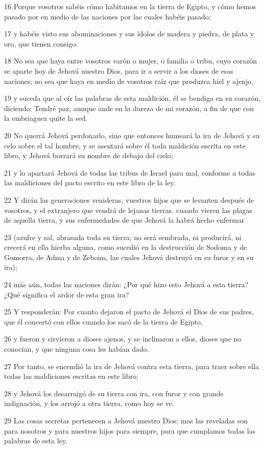 \par 16 Porque vosotros sabéis cómo habitamos en la tierra de Egipto, y cómo hemos pasado por en medio de las naciones por las cuales habéis pasado; 
\par 17 y habéis visto sus abominaciones y sus ídolos de madera y piedra, de plata y oro, que tienen consigo.
\par 18 No sea que haya entre vosotros varón o mujer, o familia o tribu, cuyo corazón se aparte hoy de Jehová nuestro Dios, para ir a servir a los dioses de esas naciones; no sea que haya en medio de vosotros raíz que produzca hiel y ajenjo, 
\par 19 y suceda que al oír las palabras de esta maldición, él se bendiga en su corazón, diciendo: Tendré paz, aunque ande en la dureza de mi corazón, a fin de que con la embriaguez quite la sed.
\par 20 No querrá Jehová perdonarlo, sino que entonces humeará la ira de Jehová y su celo sobre el tal hombre, y se asentará sobre él toda maldición escrita en este libro, y Jehová borrará su nombre de debajo del cielo;
\par 21 y lo apartará Jehová de todas las tribus de Israel para mal, conforme a todas las maldiciones del pacto escrito en este libro de la ley.
\par 22 Y dirán las generaciones venideras, vuestros hijos que se levanten después de vosotros, y el extranjero que vendrá de lejanas tierras, cuando vieren las plagas de aquella tierra, y sus enfermedades de que Jehová la habrá hecho enfermar
\par 23 (azufre y sal, abrasada toda su tierra; no será sembrada, ni producirá, ni crecerá en ella hierba alguna, como sucedió en la destrucción de Sodoma y de Gomorra, de Adma y de Zeboim, las cuales Jehová destruyó en su furor y en su ira);
\par 24 más aún, todas las naciones dirán: ¿Por qué hizo esto Jehová a esta tierra? ¿Qué significa el ardor de esta gran ira?
\par 25 Y responderán: Por cuanto dejaron el pacto de Jehová el Dios de sus padres, que él concertó con ellos cuando los sacó de la tierra de Egipto,
\par 26 y fueron y sirvieron a dioses ajenos, y se inclinaron a ellos, dioses que no conocían, y que ninguna cosa les habían dado.
\par 27 Por tanto, se encendió la ira de Jehová contra esta tierra, para traer sobre ella todas las maldiciones escritas en este libro;
\par 28 y Jehová los desarraigó de su tierra con ira, con furor y con grande indignación, y los arrojó a otra tierra, como hoy se ve.
\par 29 Las cosas secretas pertenecen a Jehová nuestro Dios; mas las reveladas son para nosotros y para nuestros hijos para siempre, para que cumplamos todas las palabras de esta ley.

